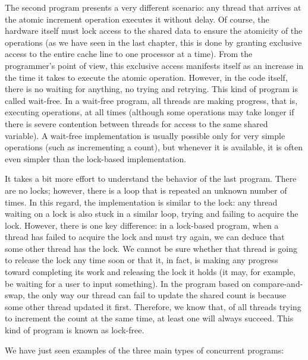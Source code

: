 The second program presents a very different scenario: any thread that arrives at the atomic increment operation executes it without delay. Of course, the hardware itself must lock access to the shared data to ensure the atomicity of the operations (as we have seen in the last chapter, this is done by granting exclusive access to the entire cache line to one processor at a time). From the programmer's point of view, this exclusive access manifests itself as an increase in the time it takes to execute the atomic operation. However, in the code itself, there is no waiting for anything, no trying and retrying. This kind of program is called wait-free. In a wait-free program, all threads are making progress, that is, executing operations, at all times (although some operations may take longer if there is severe contention between threads for access to the same shared variable). A wait-free implementation is usually possible only for very simple operations (such as incrementing a count), but whenever it is available, it is often even simpler than the lock-based implementation.

It takes a bit more effort to understand the behavior of the last program. There are no locks; however, there is a loop that is repeated an unknown number of times. In this regard, the implementation is similar to the lock: any thread waiting on a lock is also stuck in a similar loop, trying and failing to acquire the lock. However, there is one key difference: in a lock-based program, when a thread has failed to acquire the lock and must try again, we can deduce that some other thread has the lock. We cannot be sure whether that thread is going to release the lock any time soon or that it, in fact, is making any progress toward completing its work and releasing the lock it holds (it may, for example, be waiting for a user to input something). In the program based on compare-and-swap, the only way our thread can fail to update the shared count is because some other thread updated it first. Therefore, we know that, of all threads trying to increment the count at the same time, at least one will always succeed. This kind of program is known as lock-free.

We have just seen examples of the three main types of concurrent programs:

